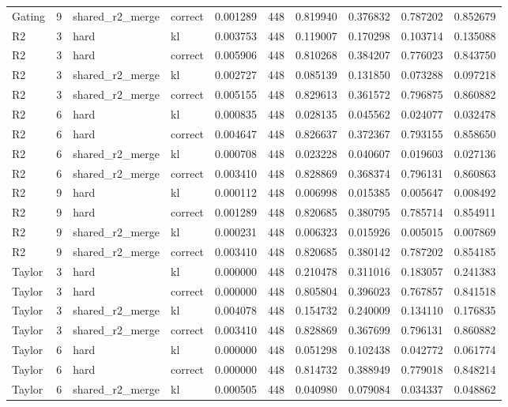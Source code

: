 \begin{tabular}{lrllrrrrrr}
Gating & 9 & shared_r2_merge & correct & 0.001289 & 448 & 0.819940 & 0.376832 & 0.787202 & 0.852679 \\
R2 & 3 & hard & kl & 0.003753 & 448 & 0.119007 & 0.170298 & 0.103714 & 0.135088 \\
R2 & 3 & hard & correct & 0.005906 & 448 & 0.810268 & 0.384207 & 0.776023 & 0.843750 \\
R2 & 3 & shared_r2_merge & kl & 0.002727 & 448 & 0.085139 & 0.131850 & 0.073288 & 0.097218 \\
R2 & 3 & shared_r2_merge & correct & 0.005155 & 448 & 0.829613 & 0.361572 & 0.796875 & 0.860882 \\
R2 & 6 & hard & kl & 0.000835 & 448 & 0.028135 & 0.045562 & 0.024077 & 0.032478 \\
R2 & 6 & hard & correct & 0.004647 & 448 & 0.826637 & 0.372367 & 0.793155 & 0.858650 \\
R2 & 6 & shared_r2_merge & kl & 0.000708 & 448 & 0.023228 & 0.040607 & 0.019603 & 0.027136 \\
R2 & 6 & shared_r2_merge & correct & 0.003410 & 448 & 0.828869 & 0.368374 & 0.796131 & 0.860863 \\
R2 & 9 & hard & kl & 0.000112 & 448 & 0.006998 & 0.015385 & 0.005647 & 0.008492 \\
R2 & 9 & hard & correct & 0.001289 & 448 & 0.820685 & 0.380795 & 0.785714 & 0.854911 \\
R2 & 9 & shared_r2_merge & kl & 0.000231 & 448 & 0.006323 & 0.015926 & 0.005015 & 0.007869 \\
R2 & 9 & shared_r2_merge & correct & 0.003410 & 448 & 0.820685 & 0.380142 & 0.787202 & 0.854185 \\
Taylor & 3 & hard & kl & 0.000000 & 448 & 0.210478 & 0.311016 & 0.183057 & 0.241383 \\
Taylor & 3 & hard & correct & 0.000000 & 448 & 0.805804 & 0.396023 & 0.767857 & 0.841518 \\
Taylor & 3 & shared_r2_merge & kl & 0.004078 & 448 & 0.154732 & 0.240009 & 0.134110 & 0.176835 \\
Taylor & 3 & shared_r2_merge & correct & 0.003410 & 448 & 0.828869 & 0.367699 & 0.796131 & 0.860882 \\
Taylor & 6 & hard & kl & 0.000000 & 448 & 0.051298 & 0.102438 & 0.042772 & 0.061774 \\
Taylor & 6 & hard & correct & 0.000000 & 448 & 0.814732 & 0.388949 & 0.779018 & 0.848214 \\
Taylor & 6 & shared_r2_merge & kl & 0.000505 & 448 & 0.040980 & 0.079084 & 0.034337 & 0.048862 \\

\end{tabular}
